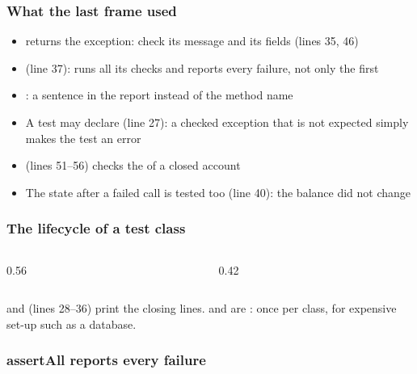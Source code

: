 \documentclass[aspectratio=169,10pt,compress]{beamer}
\begin{document}
\begin{frame}[t,fragile] \frametitle{What the last frame used}
	\begin{itemize}\small
		\item {} returns the exception: check its message and its fields (lines 35, 46)
		\item {} (line 37): runs all its checks and reports every failure, not only the first
		\item {}: a sentence in the report instead of the method name
		\item A test may declare  (line 27): a checked exception that is not expected simply makes the test an error
		\item {} (lines 51--56) checks the  of a closed account
		\item The state after a failed call is tested too (line 40): the balance did not change
	\end{itemize}
\end{frame}




\begin{frame}[t,fragile] \frametitle{The lifecycle of a test class}
	\begin{columns}[T]
		\begin{column}{0.56\textwidth}
		\end{column}
		\begin{column}{0.42\textwidth}
			\uncover<2->{\lstoutput[basicstyle=\ttfamily\fontsize{6.4}{7.6}\selectfont, firstline=3]{codeoutput/Lifecycle.txt}}
		\end{column}
	\end{columns}

	\footnotesize {} and  (lines 28--36) print the closing lines.  and
	 are : once per class, for expensive set-up such as a database.
\end{frame}




\begin{frame}[t,fragile] \frametitle{assertAll reports every failure}

	\small {}
\end{frame}
\end{document}
